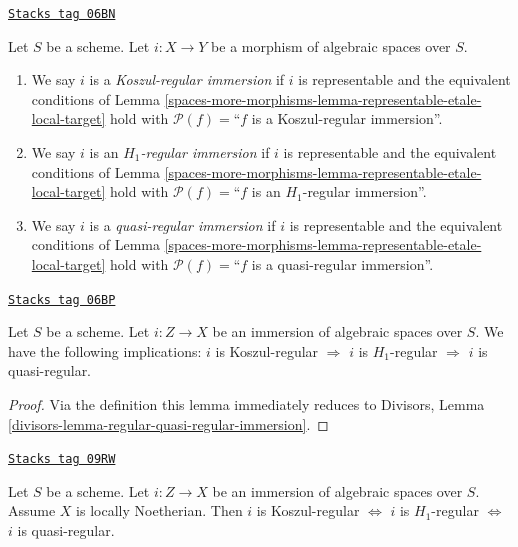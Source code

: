 \begin{definition}
\label{spaces-more-morphisms-definition-regular-immersion}
\href{https://stacks.math.columbia.edu/tag/06BN}{\texttt{Stacks tag 06BN}}

Let $S$ be a scheme. Let $i : X \to Y$ be a morphism of algebraic
spaces over $S$.
\begin{enumerate}
\item We say $i$ is a {\it Koszul-regular immersion} if $i$ is representable
and the equivalent conditions of
Lemma \ref{spaces-more-morphisms-lemma-representable-etale-local-target}
hold with $\mathcal{P}(f) =$``$f$ is a Koszul-regular immersion''.
\item We say $i$ is an {\it $H_1$-regular immersion} if $i$ is representable
and the equivalent conditions of
Lemma \ref{spaces-more-morphisms-lemma-representable-etale-local-target}
hold with $\mathcal{P}(f) =$``$f$ is an $H_1$-regular immersion''.
\item We say $i$ is a {\it quasi-regular immersion} if $i$ is representable
and the equivalent conditions of
Lemma \ref{spaces-more-morphisms-lemma-representable-etale-local-target}
hold with $\mathcal{P}(f) =$``$f$ is a quasi-regular immersion''.
\end{enumerate}
\end{definition}

\begin{lemma}
\label{spaces-more-morphisms-lemma-regular-quasi-regular-immersion}
\href{https://stacks.math.columbia.edu/tag/06BP}{\texttt{Stacks tag 06BP}}

Let $S$ be a scheme.
Let $i : Z \to X$ be an immersion of algebraic spaces over $S$.
We have the following implications:
$i$ is Koszul-regular $\Rightarrow$
$i$ is $H_1$-regular $\Rightarrow$
$i$ is quasi-regular.
\end{lemma}

\begin{proof}
Via the definition this lemma immediately reduces to
Divisors, Lemma \ref{divisors-lemma-regular-quasi-regular-immersion}.
\end{proof}

\begin{lemma}
\label{spaces-more-morphisms-lemma-regular-immersion-noetherian}
\href{https://stacks.math.columbia.edu/tag/09RW}{\texttt{Stacks tag 09RW}}

Let $S$ be a scheme.
Let $i : Z \to X$ be an immersion of algebraic spaces over $S$.
Assume $X$ is locally Noetherian. Then
$i$ is Koszul-regular $\Leftrightarrow$
$i$ is $H_1$-regular $\Leftrightarrow$
$i$ is quasi-regular.
\end{lemma}

